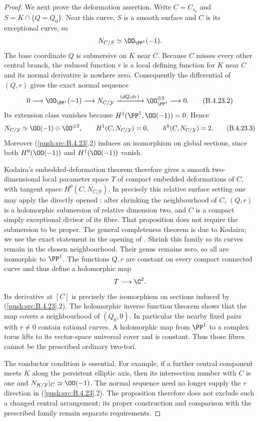 \begin{proof}
We next prove the deformation assertion. Write
$C=C_{s_0}$ and $S=K\cap\{Q=Q_0\}$. Near this curve,
$S$ is a smooth surface and $C$ is its exceptional curve,
so
\[
 N_{C/S}\simeq\OO_{\PP^1}(-1).
\]
The base coordinate $Q$ is submersive on $K$ near $C$.
Because $C$ misses every other central branch, the reduced
function $r$ is a local defining function for $K$ near
$C$ and its normal derivative is nowhere zero.
Consequently the differential of $(Q,r)$ gives the exact
normal sequence
\[
 0\longrightarrow\OO_{\PP^1}(-1)
 \longrightarrow N_{C/\mathcal Y}
 \xrightarrow{\ (dQ,dr)\ }
 \OO_{\PP^1}^{\oplus2}\longrightarrow0.
                                                        \tag{B.4.23.2}
\]
Its extension class vanishes because
$H^1(\PP^1,\OO(-1))=0$. Hence
\[
 N_{C/\mathcal Y}\simeq
 \OO(-1)\oplus\OO^{\oplus2},\qquad
 H^1(C,N_{C/\mathcal Y})=0,\qquad
 h^0(C,N_{C/\mathcal Y})=2.                             \tag{B.4.23.3}
\]
Moreover (\ref{push:src:B.4.23}.2) induces an isomorphism on global
sections, since both $H^0(\OO(-1))$ and $H^1(\OO(-1))$
vanish.

Kodaira's embedded-deformation theorem therefore gives a
smooth two-dimensional local parameter space $T$ of
compact embedded deformations of $C$, with tangent space
$H^0(C,N_{C/\mathcal Y})$. In precisely this relative
surface setting one may apply the directly opened
\citet[Proposition 2.3 and its proof, pp.~6--7 of the
original preprint]{DlousskyTeleman2012AB}: after shrinking
the neighbourhood of $C$, $(Q,r)$ is a holomorphic
submersion of relative dimension two, and $C$ is a
compact simply exceptional divisor of its fibre.
That proposition does not require the submersion to be
proper. The general completeness theorem is due to Kodaira; we use the exact statement in the opening of \citet{Merkulov1995D}.
Shrink this family so its curves
remain in the chosen neighbourhood. Their genus remains
zero, so all are isomorphic to $\PP^1$.
The functions $Q,r$ are constant on every compact
connected curve and thus define a holomorphic map
\[
 T\longrightarrow\C^2.
\]
Its derivative at $[C]$ is precisely the isomorphism on
sections induced by (\ref{push:src:B.4.23}.2). The holomorphic inverse
function theorem shows that the map covers a neighbourhood
of $(Q_0,0)$. In particular the nearby fixed pairs with
$r\ne0$ contain rational curves. A holomorphic map from
$\PP^1$ to a complex torus lifts to its vector-space
universal cover and is constant. Thus those fibres cannot
be the prescribed ordinary two-tori.

The conductor condition is essential. For example, if a
further central component meets $K$ along the persistent
elliptic axis, then its intersection number with $C$ is
one and $N_{K/\mathcal Y}|_C\simeq\OO(-1)$.
The normal sequence need no longer supply the $r$ direction
in (\ref{push:src:B.4.23}.2). The proposition therefore does not exclude
such a changed central arrangement; its proper construction
and comparison with the prescribed family remain separate
requirements.
\end{proof}

